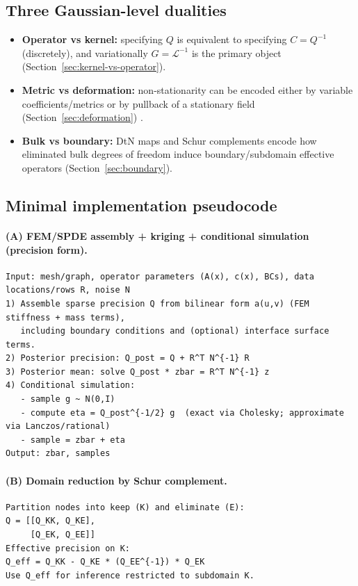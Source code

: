 \documentclass[11pt]{article}
\theoremstyle{definition}
\theoremstyle{plain}
\theoremstyle{remark}
\begin{document}
\subsection{Three Gaussian-level dualities}
\begin{itemize}[leftmargin=2em]
\item \textbf{Operator vs kernel:} specifying $Q$ is equivalent to specifying $C=Q^{-1}$ (discretely), and variationally $G=\mathcal{L}^{-1}$ is the primary object (Section~\ref{sec:kernel-vs-operator}).
\item \textbf{Metric vs deformation:} non-stationarity can be encoded either by variable coefficients/metrics or by pullback of a stationary field (Section~\ref{sec:deformation}) \citep{SampsonGuttorp1992}.
\item \textbf{Bulk vs boundary:} DtN maps and Schur complements encode how eliminated bulk degrees of freedom induce boundary/subdomain effective operators (Section~\ref{sec:boundary}).
\end{itemize}

\subsection{Minimal implementation pseudocode}

\paragraph{(A) FEM/SPDE assembly + kriging + conditional simulation (precision form).}
\begin{lstlisting}
Input: mesh/graph, operator parameters (A(x), c(x), BCs), data locations/rows R, noise N
1) Assemble sparse precision Q from bilinear form a(u,v) (FEM stiffness + mass terms),
   including boundary conditions and (optional) interface surface terms.
2) Posterior precision: Q_post = Q + R^T N^{-1} R
3) Posterior mean: solve Q_post * zbar = R^T N^{-1} z
4) Conditional simulation:
   - sample g ~ N(0,I)
   - compute eta = Q_post^{-1/2} g  (exact via Cholesky; approximate via Lanczos/rational)
   - sample = zbar + eta
Output: zbar, samples
\end{lstlisting}

\paragraph{(B) Domain reduction by Schur complement.}
\begin{lstlisting}
Partition nodes into keep (K) and eliminate (E):
Q = [[Q_KK, Q_KE],
     [Q_EK, Q_EE]]
Effective precision on K:
Q_eff = Q_KK - Q_KE * (Q_EE^{-1}) * Q_EK
Use Q_eff for inference restricted to subdomain K.
\end{lstlisting}
\end{document}
